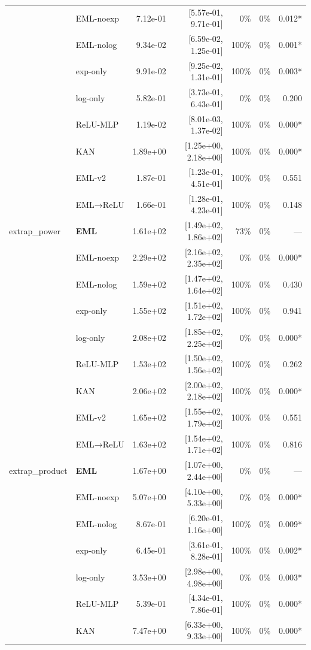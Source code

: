 \begin{table}[t]
\begin{tabular}{llrrrrr}
 & EML-noexp & 7.12e-01 & [5.57e-01, 9.71e-01] & 0\% & 0\% & 0.012* \\
 & EML-nolog & 9.34e-02 & [6.59e-02, 1.25e-01] & 100\% & 0\% & 0.001* \\
 & exp-only & 9.91e-02 & [9.25e-02, 1.31e-01] & 100\% & 0\% & 0.003* \\
 & log-only & 5.82e-01 & [3.73e-01, 6.43e-01] & 0\% & 0\% & 0.200 \\
 & ReLU-MLP & 1.19e-02 & [8.01e-03, 1.37e-02] & 100\% & 0\% & 0.000* \\
 & KAN & 1.89e+00 & [1.25e+00, 2.18e+00] & 100\% & 0\% & 0.000* \\
 & EML-v2 & 1.87e-01 & [1.23e-01, 4.51e-01] & 100\% & 0\% & 0.551 \\
 & EML→ReLU & 1.66e-01 & [1.28e-01, 4.23e-01] & 100\% & 0\% & 0.148 \\
\midrule
extrap\_power & \textbf{EML} & 1.61e+02 & [1.49e+02, 1.86e+02] & 73\% & 0\% & — \\
 & EML-noexp & 2.29e+02 & [2.16e+02, 2.35e+02] & 0\% & 0\% & 0.000* \\
 & EML-nolog & 1.59e+02 & [1.47e+02, 1.64e+02] & 100\% & 0\% & 0.430 \\
 & exp-only & 1.55e+02 & [1.51e+02, 1.72e+02] & 100\% & 0\% & 0.941 \\
 & log-only & 2.08e+02 & [1.85e+02, 2.25e+02] & 0\% & 0\% & 0.000* \\
 & ReLU-MLP & 1.53e+02 & [1.50e+02, 1.56e+02] & 100\% & 0\% & 0.262 \\
 & KAN & 2.06e+02 & [2.00e+02, 2.18e+02] & 100\% & 0\% & 0.000* \\
 & EML-v2 & 1.65e+02 & [1.55e+02, 1.79e+02] & 100\% & 0\% & 0.551 \\
 & EML→ReLU & 1.63e+02 & [1.54e+02, 1.71e+02] & 100\% & 0\% & 0.816 \\
\midrule
extrap\_product & \textbf{EML} & 1.67e+00 & [1.07e+00, 2.44e+00] & 0\% & 0\% & — \\
 & EML-noexp & 5.07e+00 & [4.10e+00, 5.33e+00] & 0\% & 0\% & 0.000* \\
 & EML-nolog & 8.67e-01 & [6.20e-01, 1.16e+00] & 100\% & 0\% & 0.009* \\
 & exp-only & 6.45e-01 & [3.61e-01, 8.28e-01] & 100\% & 0\% & 0.002* \\
 & log-only & 3.53e+00 & [2.98e+00, 4.98e+00] & 0\% & 0\% & 0.003* \\
 & ReLU-MLP & 5.39e-01 & [4.34e-01, 7.86e-01] & 100\% & 0\% & 0.000* \\
 & KAN & 7.47e+00 & [6.33e+00, 9.33e+00] & 100\% & 0\% & 0.000* \\

\end{tabular}
\end{table}
